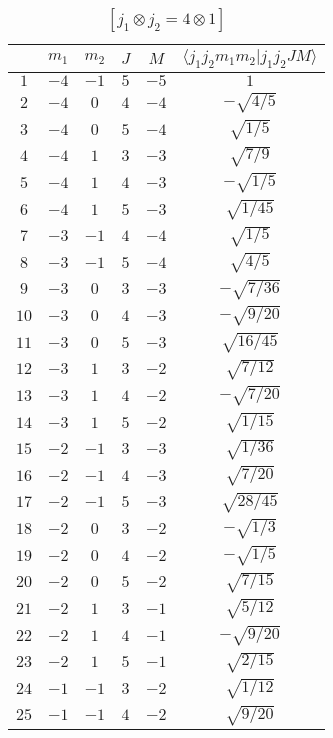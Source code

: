 \begin{table}
\tiny
\caption{$[j_1 \otimes j_2 = 4 \otimes 1]$}
\begin{center}
\begin{tabular}{|c|c|c|c|c|c|}
\hline 
   & $m_1$ & $m_2$ & $J$ & $M$ & $\langle j_1 j_2 m_1 m_2 | j_1 j_2 J M \rangle$ \\ 
\hline 
$1$ & $-4$ & $-1$ & $5$ & $-5$ & $1$ \\ 
$2$ & $-4$ & $0$ & $4$ & $-4$ & $-\sqrt{4/5}$ \\ 
$3$ & $-4$ & $0$ & $5$ & $-4$ & $\sqrt{1/5}$ \\ 
$4$ & $-4$ & $1$ & $3$ & $-3$ & $\sqrt{7/9}$ \\ 
$5$ & $-4$ & $1$ & $4$ & $-3$ & $-\sqrt{1/5}$ \\ 
$6$ & $-4$ & $1$ & $5$ & $-3$ & $\sqrt{1/45}$ \\ 
$7$ & $-3$ & $-1$ & $4$ & $-4$ & $\sqrt{1/5}$ \\ 
$8$ & $-3$ & $-1$ & $5$ & $-4$ & $\sqrt{4/5}$ \\ 
$9$ & $-3$ & $0$ & $3$ & $-3$ & $-\sqrt{7/36}$ \\ 
$10$ & $-3$ & $0$ & $4$ & $-3$ & $-\sqrt{9/20}$ \\ 
$11$ & $-3$ & $0$ & $5$ & $-3$ & $\sqrt{16/45}$ \\ 
$12$ & $-3$ & $1$ & $3$ & $-2$ & $\sqrt{7/12}$ \\ 
$13$ & $-3$ & $1$ & $4$ & $-2$ & $-\sqrt{7/20}$ \\ 
$14$ & $-3$ & $1$ & $5$ & $-2$ & $\sqrt{1/15}$ \\ 
$15$ & $-2$ & $-1$ & $3$ & $-3$ & $\sqrt{1/36}$ \\ 
$16$ & $-2$ & $-1$ & $4$ & $-3$ & $\sqrt{7/20}$ \\ 
$17$ & $-2$ & $-1$ & $5$ & $-3$ & $\sqrt{28/45}$ \\ 
$18$ & $-2$ & $0$ & $3$ & $-2$ & $-\sqrt{1/3}$ \\ 
$19$ & $-2$ & $0$ & $4$ & $-2$ & $-\sqrt{1/5}$ \\ 
$20$ & $-2$ & $0$ & $5$ & $-2$ & $\sqrt{7/15}$ \\ 
$21$ & $-2$ & $1$ & $3$ & $-1$ & $\sqrt{5/12}$ \\ 
$22$ & $-2$ & $1$ & $4$ & $-1$ & $-\sqrt{9/20}$ \\ 
$23$ & $-2$ & $1$ & $5$ & $-1$ & $\sqrt{2/15}$ \\ 
$24$ & $-1$ & $-1$ & $3$ & $-2$ & $\sqrt{1/12}$ \\ 
$25$ & $-1$ & $-1$ & $4$ & $-2$ & $\sqrt{9/20}$ \\ 

\end{tabular}
\end{center}
\end{table}
